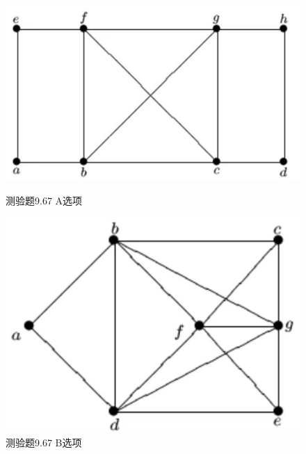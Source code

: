 \documentclass[UTF8, heading=true]{ctexart}
\begin{document}
\begin{figure}[H]
  \centering
  \begin{minipage}[t]{0.35\textwidth}
      \centering
      \includegraphics[width=1\textwidth]{9.67_1.jpg} %
      \vspace{-0.3cm}
      \caption{测验题9.67 A选项}
  \end{minipage}
  \hspace{0.1\textwidth} %
  \begin{minipage}[t]{0.35\textwidth}
      \centering
      \includegraphics[width=1\textwidth]{9.67_2.jpg} %
      \vspace{-0.3cm}
      \caption{测验题9.67 B选项}
\end{minipage}
\end{figure}
\end{document}
